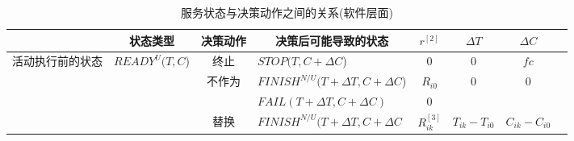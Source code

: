 \begin{table}[htbp]
      \caption{服务状态与决策动作之间的关系(软件层面)}
\newsavebox{\tablebox} %
\begin{lrbox}{\tablebox} %
      \vspace{-0.5em}\label{table:state_action}\centering{}
    \begin{tabular}{llllllll}
        \toprule
        \multicolumn{1}{|c|}{} 
        & \multicolumn{1}{c}{状态类型} 
        & \multicolumn{1}{|c}{{决策动作}} 
        & \multicolumn{1}{|c}{决策后可能导致的状态} 
        & \multicolumn{1}{|c}{$r^{[2]}$} 
        & \multicolumn{1}{|c}{$\Delta T$} 
        & \multicolumn{1}{|c|}{$\Delta C$} \\
        \hline

        \multicolumn{1}{|c|}{\multirow{9}{*}{\parbox{1em}{活动执行前的状态}}} 
        & \multirow{7}{*}{$READY^U(T,C$)} 
        & \multicolumn{1}{|c}{{终止}} 
        & \multicolumn{1}{|l}{$STOP(T, C+\Delta C$)} 
        & \multicolumn{1}{|c}{0} 
        & \multicolumn{1}{|c}{0} 
        & \multicolumn{1}{|c|}{$fc$} \\
        \cline{3-7}

        \multicolumn{1}{|c|}{} 
        &       
        & \multicolumn{1}{|c}{\multirow{2}{*}{{不作为}}} 
        & \multicolumn{1}{|l}{$FINISH^{N/U}(T+\Delta T, C+\Delta C$)} 
        & \multicolumn{1}{|c}{$R_{i0}$} 
        & \multicolumn{1}{|c}{\multirow{2}{*}{0}} 
        & \multicolumn{1}{|c|}{\multirow{2}{*}{0}} \\

        \multicolumn{1}{|c|}{} 
        &       
        & \multicolumn{1}{|c}{} 
        & \multicolumn{1}{|l}{$FAIL(T+\Delta T, C+\Delta C)$} 
        & \multicolumn{1}{|c}{0}
        & \multicolumn{1}{|c}{} 
        & \multicolumn{1}{|c|}{} \\
        \cline{3-7}

        \multicolumn{1}{|c|}{} 
        &       
        & \multicolumn{1}{|c}{\multirow{2}{*}{替换}} 
        & \multicolumn{1}{|l}{$FINISH^{N/U}(T+\Delta T, C+\Delta C$} 
        & \multicolumn{1}{|c}{$R_{ik}^{[3]}$} 
        & \multicolumn{1}{|c}{\multirow{2}{*}{$T_{ik}-T_{i0}$}} 
        & \multicolumn{1}{|c|}{\multirow{2}{*}{$C_{ik}-C_{i0}$}} \\


\end{tabular}
\end{lrbox}
\end{table}
